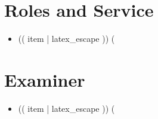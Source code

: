 \documentclass[10pt]{article}
\begin{document}
\section{Roles and Service}

\begin{itemize}
(%
  \item (( item | latex_escape ))
(%
\end{itemize}

\section{Examiner}

\begin{itemize}
(%
  \item (( item | latex_escape ))
(%
\end{itemize}
\end{document}
